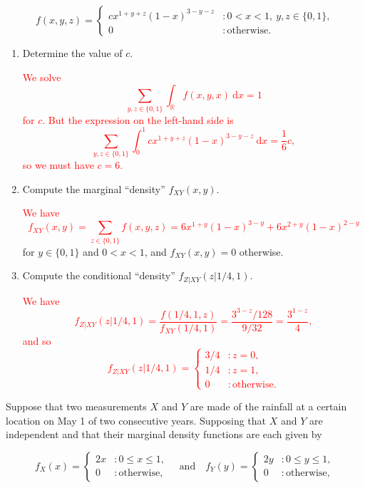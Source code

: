 \documentclass[12pt,reqno]{amsart}
\begin{document}
	\[f(x,y,z) = \begin{cases}
	c x^{1+y+z} ( 1-x)^{3-y-z} & : 0 < x< 1, \ y,z\in \{0,1\}, \\
	0 & : \text{otherwise}.
	\end{cases}
	\]
	
\medskip
\begin{enumerate}
\item Determine the value of $c$.

\bigskip
\textcolor{red}{We solve
	\[\sum_{y,z\in \{0,1\}} \int_\mathbb{R} f(x,y,x) \ \text{d}x = 1
	\]
for $c$. But the expression on the left-hand side is
	\[\sum_{y,z\in \{0,1\}} \int_0^1 c x^{1+y+z}( 1-x)^{3-y-z} \ \text{d}x = \frac{1}{6}c,
	\]
so we must have $c = 6$.}
\bigskip

\item Compute the marginal ``density'' $f_{XY}(x,y)$.

\bigskip
\textcolor{red}{We have
	\[f_{XY}(x,y) = \sum_{z\in\{0,1\}} f(x,y,z) = 6x^{1+y}(1-x)^{3-y} + 6x^{2+y}(1-x)^{2-y}
	\]}
for $y\in \{0,1\}$ and $0 < x < 1$, and $f_{XY}(x,y)=0$ otherwise.
\bigskip


\item Compute the conditional ``density'' $f_{Z|XY}(z|1/4, 1)$.

\bigskip
\textcolor{red}{We have
	\[f_{Z|XY}(z|1/4,1) = \frac{f(1/4,1,z)}{f_{XY}(1/4,1)} = \frac{3^{3-z}/128}{9/32} = \frac{3^{1-z}}{4},
	\]
and so
	\[f_{Z|XY}(z|1/4,1) = \begin{cases}
	3/4 & : z=0, \\
	1/4 & : z=1, \\
	0 & : \text{otherwise}.
	\end{cases}
	\]}

\end{enumerate}













\bigskip
\prob Suppose that two measurements $X$ and $Y$ are made of the rainfall at a certain location on May 1 of two consecutive years. Supposing that $X$ and $Y$ are independent and that their marginal density functions are each given by

	\[f_X(x) = \begin{cases}
	2x & : 0 \leq x \leq 1, \\
	0 & : \text{otherwise},
	\end{cases} \quad \text{and} \quad
	f_Y(y) = \begin{cases}
	2y & : 0 \leq y \leq 1, \\
	0 & : \text{otherwise},
	\end{cases}
	\]
\end{document}
